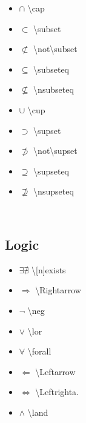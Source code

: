 \begin{minipage}{3cm}
\begin{itemize}[label={}]
    \item $\cap$ \textbackslash cap
    \item $\subset$ \textbackslash subset
    \item $\not\subset$ \textbackslash not\textbackslash subset
    \item $\subseteq$ \textbackslash subseteq
    \item $\nsubseteq$ \textbackslash nsubseteq
\end{itemize} 
\end{minipage}\begin{minipage}{3cm}
\begin{itemize}[label={}]
    \item $\cup$ \textbackslash cup
    \item $\supset$ \textbackslash supset
    \item $\not\supset$ \textbackslash not\textbackslash supset
    \item $\supseteq$ \textbackslash supseteq
    \item $\nsupseteq$ \textbackslash nsupseteq
\end{itemize} 
\end{minipage}\ \\


\subsection*{Logic}
\begin{minipage}{3cm}
\begin{itemize}[label={}]
    \item $\exists\nexists$ \textbackslash [n]exists
    \item $\Rightarrow$ \textbackslash Rightarrow
    \item $\neg$ \textbackslash neg
    \item $\lor$ \textbackslash lor
\end{itemize} 
\end{minipage}
\begin{minipage}{3cm}
\begin{itemize}[label={}]
    \item $\forall$ \textbackslash forall
    \item $\Leftarrow$ \textbackslash Leftarrow
    \item $\Leftrightarrow$ \textbackslash Leftrighta.
    \item $\land$ \textbackslash land
\end{itemize} 
\end{minipage}\ \\


